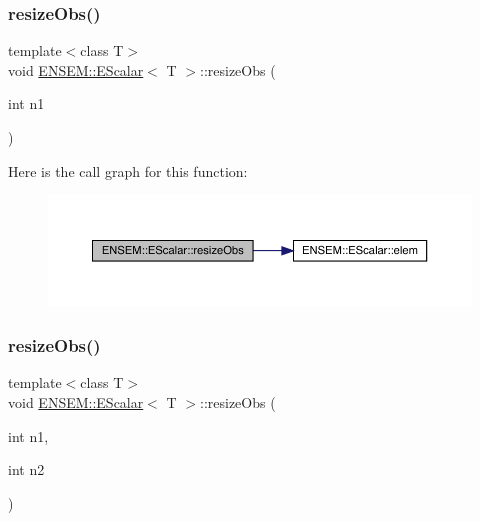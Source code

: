 \subsubsection{\texorpdfstring{resizeObs()}{resizeObs()}\hspace{0.1cm}{\footnotesize\ttfamily [2/8]}}
{\footnotesize\ttfamily template$<$class T$>$ \\
void \mbox{\hyperlink{classENSEM_1_1EScalar}{E\+N\+S\+E\+M\+::\+E\+Scalar}}$<$ T $>$\+::resize\+Obs (\begin{DoxyParamCaption}\item[{int}]{n1 }\end{DoxyParamCaption})\hspace{0.3cm}{\ttfamily [inline]}}

Here is the call graph for this function\+:
\nopagebreak
\begin{figure}[H]
\begin{center}
\leavevmode
\includegraphics[width=350pt]{d0/d82/classENSEM_1_1EScalar_af9faf602be10ce072be3fc532a7e17fe_cgraph}
\end{center}
\end{figure}
\mbox{\label{classENSEM_1_1EScalar_ad4fe54c2fb8a3420e1e452228d8d40b1}} 
\subsubsection{\texorpdfstring{resizeObs()}{resizeObs()}\hspace{0.1cm}{\footnotesize\ttfamily [3/8]}}
{\footnotesize\ttfamily template$<$class T$>$ \\
void \mbox{\hyperlink{classENSEM_1_1EScalar}{E\+N\+S\+E\+M\+::\+E\+Scalar}}$<$ T $>$\+::resize\+Obs (\begin{DoxyParamCaption}\item[{int}]{n1,  }\item[{int}]{n2 }\end{DoxyParamCaption})\hspace{0.3cm}{\ttfamily [inline]}}

